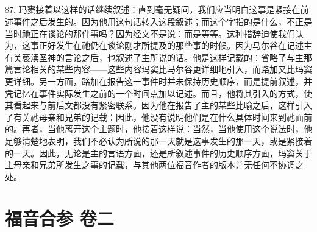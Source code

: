 
\subsection{}

87. 玛窦接着以这样的话继续叙述：直到毫无疑问，我们应当明白这事是紧接在前述事件之后发生的。因为他用这句话转入这段叙述；而这个字指的是什么，不正是当时祂正在谈论的那件事吗？因为经文不是说：而是等等。这种措辞迫使我们认为，这事正好发生在祂仍在谈论刚才所提及的那些事的时候。因为马尔谷在记述主有关亵渎圣神的言论之后，也叙述了主所说的话。他是这样记载的：省略了与主那篇言论相关的某些内容——这些内容玛窦比马尔谷更详细地引入，而路加又比玛窦更详细。另一方面，路加在报告这一事件时并未保持历史顺序，而是提前叙述，并凭记忆在事件实际发生之前的一个时间点加以记述。而且，他将其引入的方式，使其看起来与前后文都没有紧密联系。因为他在报告了主的某些比喻之后，这样引入了有关祂母亲和兄弟的记载：因此，他没有说明他们是在什么具体时间来到祂面前的。再者，当他离开这个主题时，他接着这样说：当然，当他使用这个说法时，他足够清楚地表明，我们不必认为所说的那一天就是这事发生的那一天，或是紧接着的一天。因此，无论是主的言语方面，还是所叙述事件的历史顺序方面，玛窦关于主母亲和兄弟所发生之事的记载，与其他两位福音作者的版本并无任何不协调之处。\par



\section{福音合参 卷二}


